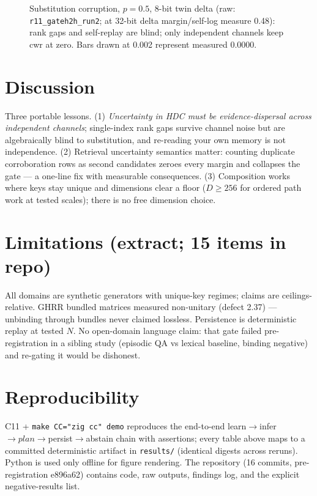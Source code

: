 \documentclass[10pt,twocolumn]{article}
\begin{document}
\begin{figure}[t]\centering
{}
\caption{Substitution corruption, $p{=}0.5$, 8-bit twin delta (raw: \texttt{r11\_gateh2h\_run2}; at 32-bit delta margin/self-log measure 0.48): rank gaps and self-replay are blind; only independent channels keep cwr at zero. Bars drawn at 0.002 represent measured 0.0000.}\label{fig:gate}
\end{figure}

\section{Discussion}
Three portable lessons. (1) \emph{Uncertainty in HDC must be evidence-dispersal across independent channels}; single-index rank gaps survive channel noise but are algebraically blind to substitution, and re-reading your own memory is not independence. (2) Retrieval uncertainty semantics matter: counting duplicate corroboration rows as second candidates zeroes every margin and collapses the gate --- a one-line fix with measurable consequences. (3) Composition works where keys stay unique and dimensions clear a floor ($D{\ge}256$ for ordered path work at tested scales); there is no free dimension choice.

\section{Limitations (extract; 15 items in repo)}
All domains are synthetic generators with unique-key regimes; claims are ceilings-relative. GHRR bundled matrices measured non-unitary (defect 2.37) --- unbinding through bundles never claimed lossless. Persistence is deterministic replay at tested $N$. No open-domain language claim: that gate failed pre-registration in a sibling study (episodic QA vs lexical baseline, binding negative) and re-gating it would be dishonest.

\section{Reproducibility}
C11 + \texttt{make CC="zig cc" demo} reproduces the end-to-end learn$\to$infer$\to plan\to$persist$\to$abstain chain with assertions; every table above maps to a committed deterministic artifact in \texttt{results/} (identical digests across reruns). Python is used only offline for figure rendering. The repository (16 commits, pre-registration \textrm{e896a62}) contains code, raw outputs, findings log, and the explicit negative-results list.
\end{document}
